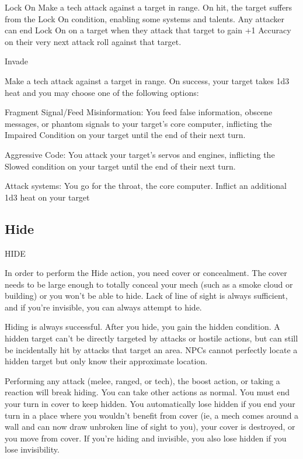Lock On  
Make a tech attack against a target in range. On hit, the target suffers from the Lock On  
condition, enabling some systems and talents. Any attacker can end Lock On on a target when  
they attack that target to gain +1 Accuracy on their very next attack roll against that target.
 

Invade
 
Make a tech attack against a target in range. On success, your target takes 1d3 heat and you  
may choose one of the following options:
 

                                                                                                                


         Fragment Signal/Feed Misinformation: You feed false information, obscene messages,  
         or phantom signals to your target’s core computer, inflicting the Impaired Condition on  
         your target until the end of their next turn.
 

         Aggressive Code: You attack your target’s servos and engines, inflicting the Slowed  
         condition on your target until the end of their next turn.
 

         Attack systems: You go for the throat, the core computer. Inflict an additional 1d3 heat  
         on your target
 
\subsection{Hide}

                                                      HIDE  

In order to perform the Hide action, you need cover or concealment. The cover needs to be large  
enough to totally conceal your mech (such as a smoke cloud or building) or you won’t be able to  
hide. Lack of line of sight is always sufficient, and if you’re invisible, you can always attempt to  
hide.
 

Hiding is always successful. After you hide, you gain the hidden condition. A hidden target can’t  
be directly targeted by attacks or hostile actions, but can still be incidentally hit by attacks that  
target an area. NPCs cannot perfectly locate a hidden target but only know their approximate  
location. 
 

Performing any attack (melee, ranged, or tech), the boost action, or taking a reaction will break  
hiding. You can take other actions as normal. You must end your turn in cover to keep hidden.  
You automatically lose hidden if you end your turn in a place where you wouldn’t benefit from  
cover (ie, a mech comes around a wall and can now draw unbroken line of sight to you), your  
cover is destroyed, or you move from cover. If you’re hiding and invisible, you also lose hidden if  
you lose invisibility.
 
